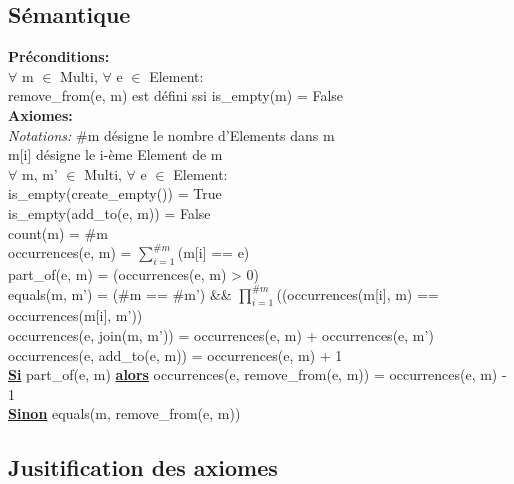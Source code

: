 \documentclass[a4paper, 11pt, oneside]{article}
\begin{document}
	\subsection{Sémantique}
	\noindent \textbf{Préconditions:}
	\\ \indent $\forall$ m $\in$ Multi, $\forall$ e $\in$ Element:
	\\ \indent \indent remove\_from(e, m) est défini ssi is\_empty(m) = False
	\\ \textbf{Axiomes:}
	\\ \indent \textit{Notations:} \#m désigne le nombre d'Elements dans m 
	\\ \indent \indent \indent \indent \indent m[i] désigne le i-ème Element de m
	\\ \indent $\forall$ m, m' $\in$ Multi, $\forall$ e $\in$ Element:
	\\ \indent \indent is\_empty(create\_empty()) = True
	\\ \indent \indent is\_empty(add\_to(e, m)) = False
	\\ \indent \indent count(m) = \#m
	\\ \indent \indent occurrences(e, m) = $\sum\limits_{i=1}^{\#m}$(m[i] == e)
	\\ \indent \indent part\_of(e, m) = (occurrences(e, m) > 0)
	\\ \indent \indent equals(m, m') = (\#m == \#m') \&\& $\prod\limits_{i=1}^{\#m}$((occurrences(m[i], m) == occurrences(m[i], m'))
	\\ \indent \indent occurrences(e, join(m, m')) = occurrences(e, m) + occurrences(e, m')
	\\ \indent \indent occurrences(e, add\_to(e, m)) = occurrences(e, m) + 1
	\\ \indent \indent \textbf{\underline{Si}} part\_of(e, m) \textbf{\underline{alors}} occurrences(e, remove\_from(e, m)) = occurrences(e, m) - 1
	\\ \indent \indent \textbf{\underline{Sinon}} equals(m, remove\_from(e, m))
	
	
	\clearpage
	\subsection{Jusitification des axiomes}
\end{document}

